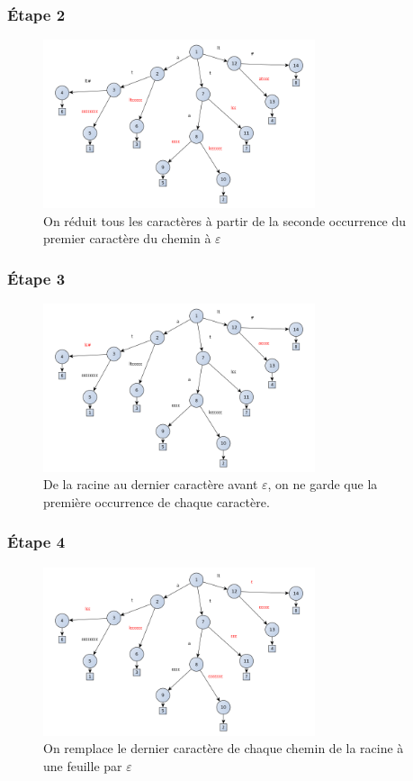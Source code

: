 \documentclass[a4paper]{article}
\begin{document}
\subsubsection{Étape 2}

\begin{figure}[ht!]
\centering
\includegraphics[width=80mm]{./slides/img/construction-1.png}
\caption{On réduit tous les caractères à partir de la seconde occurrence du premier caractère du chemin à $\varepsilon$}
\label{overflow}
\end{figure}

\subsubsection{Étape 3}

\begin{figure}[ht!]
\centering
\includegraphics[width=80mm]{./slides/img/construction-2.png}
\caption{De la racine au dernier caractère avant $\varepsilon$, on ne garde que la première occurrence de chaque caractère.}
\label{overflow}
\end{figure}

\subsubsection{Étape 4}

\begin{figure}[ht!]
\centering
\includegraphics[width=80mm]{./slides/img/construction-3.png}
\caption{On remplace le dernier caractère de chaque chemin de la racine à une feuille par $\varepsilon$}
\label{overflow}
\end{figure}
\end{document}
